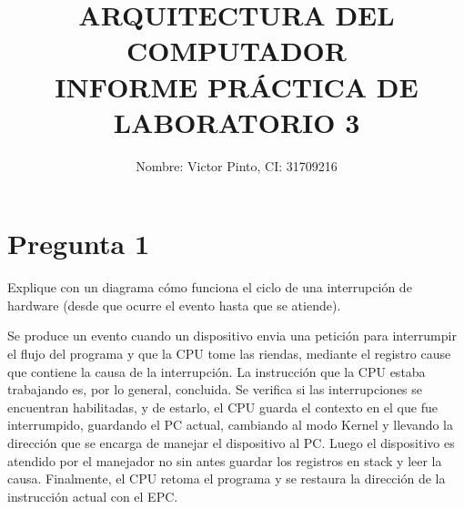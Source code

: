 \documentclass[12pt]{article}
\title{ARQUITECTURA DEL COMPUTADOR \\ INFORME PRÁCTICA DE LABORATORIO 3}
\author{Nombre: Victor Pinto, CI: 31709216}
\date{}
\begin{document}
\maketitle

\section*{Pregunta 1}
Explique con un diagrama cómo funciona el ciclo de una interrupción de hardware (desde que ocurre el evento hasta que se atiende).

Se produce un evento cuando un dispositivo envia una petición para interrumpir el flujo del programa y que la CPU tome las riendas, mediante el registro cause que contiene la causa de la interrupción. La instrucción que la CPU estaba trabajando es, por lo general, concluida. Se verifica si las interrupciones se encuentran habilitadas, y de estarlo, el CPU guarda el contexto en el que fue interrumpido, guardando el PC actual, cambiando al modo Kernel y llevando la dirección que se encarga de manejar el dispositivo al PC. Luego el dispositivo es atendido por el manejador no sin antes guardar los registros en stack y leer la causa. Finalmente, el CPU retoma el programa y se restaura la dirección de la instrucción actual con el EPC.
\end{document}
